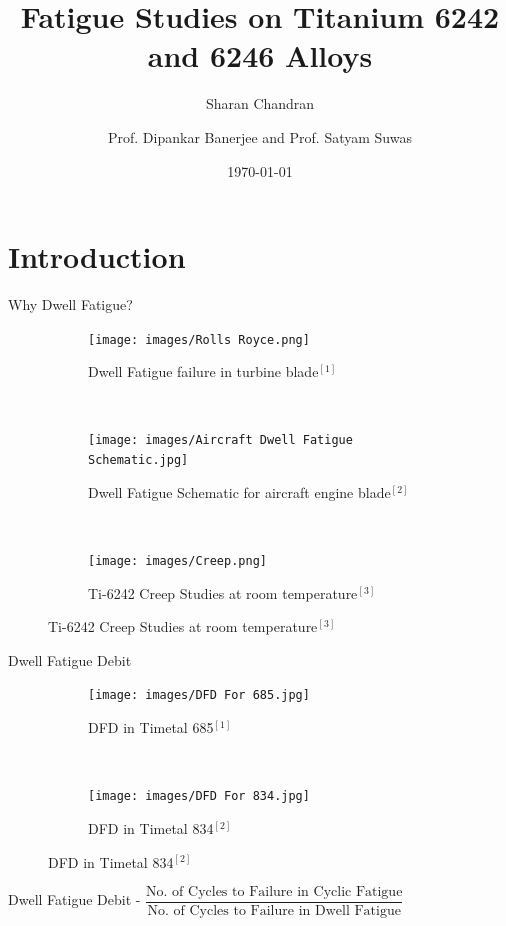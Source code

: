 \documentclass[10pt]{beamer}
\title{Fatigue Studies on Titanium 6242 and 6246 Alloys}
\subtitle{Sharan Chandran}
\date{\today}
\date{}
\author{Prof. Dipankar Banerjee and Prof. Satyam Suwas}
\institute{Indian Institute of Science}
\begin{document}

\maketitle

\section{Introduction}

{%
\begin{frame}[fragile]{Why Dwell Fatigue?}

\begin{figure}[H]
    \centering
    \begin{subfigure}{0.45\textwidth}
        \texttt{[image: images/Rolls Royce.png]}
        \caption{\tiny Dwell Fatigue failure in turbine blade$^{[1]}$}
        \end{subfigure}
    ~
    \begin{subfigure}{0.45\textwidth}
        \texttt{[image: images/Aircraft Dwell Fatigue Schematic.jpg]}
        \caption{\tiny Dwell Fatigue Schematic for aircraft engine blade$^{[2]}$}
        \end{subfigure}  
	\\	
    \begin{subfigure}{0.45\textwidth}
        \texttt{[image: images/Creep.png]}
        \caption{\tiny Ti-6242 Creep Studies at room temperature$^{[3]}$}
    \end{subfigure}   
\end{figure}


\end{frame}
}


{%
\begin{frame}[fragile]{Dwell Fatigue Debit}

\begin{figure}[H]
    \centering
    \begin{subfigure}{0.40\textwidth}
        \texttt{[image: images/DFD For 685.jpg]}
        \caption{DFD in Timetal 685$^{[1]}$}
        \end{subfigure}
    ~
    \begin{subfigure}{0.50\textwidth}
        \texttt{[image: images/DFD For 834.jpg]}
        \caption{DFD in Timetal 834$^{[2]}$}
    \end{subfigure}   
\end{figure}

Dwell Fatigue Debit - $ \dfrac{\text{No. of Cycles to Failure in Cyclic Fatigue}}{\text{No. of Cycles to Failure in Dwell Fatigue}} $  

\end{frame}
}
\end{document}

